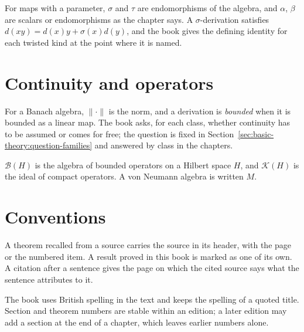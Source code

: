 For maps with a parameter, $\sigma$ and $\tau$ are endomorphisms of the algebra, %
and $\alpha$, $\beta$ are scalars or endomorphisms as the chapter says. %
A $\sigma$-derivation satisfies $d(xy)=d(x)y+\sigma(x)d(y)$, and the book gives %
the defining identity for each twisted kind at the point where it is named. %

\section*{Continuity and operators}

For a Banach algebra, $\lVert\cdot\rVert$ is the norm, and a derivation is %
\emph{bounded} when it is bounded as a linear map. %
The book asks, for each class, whether continuity has to be assumed or comes for %
free; the question is fixed in %
Section~\ref{sec:basic-theory:question-families} and answered by class in the %
chapters. %

$\mathcal{B}(H)$ is the algebra of bounded operators on a Hilbert space $H$, and %
$\mathcal{K}(H)$ is the ideal of compact operators. %
A von Neumann algebra is written $M$. %

\section*{Conventions}

A theorem recalled from a source carries the source in its header, with the page %
or the numbered item. %
A result proved in this book is marked as one of its own. %
A citation after a sentence gives the page on which the cited source says what %
the sentence attributes to it. %

The book uses British spelling in the text and keeps the spelling of a quoted %
title. %
Section and theorem numbers are stable within an edition; a later edition may %
add a section at the end of a chapter, which leaves earlier numbers alone. %
